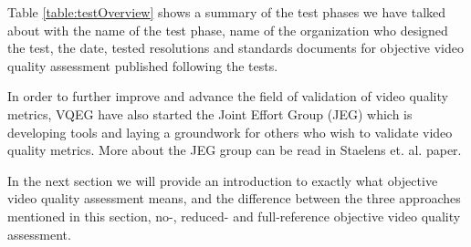 Table \ref{table:testOverview} shows a summary of the test phases we have talked about with the name of the test phase, name of the organization who designed the test, the date, tested resolutions and standards documents for objective video quality assessment published following the tests.

In order to further improve and advance the field of validation of video quality metrics, VQEG have also started the Joint Effort Group (JEG) which is developing tools and laying a groundwork for others who wish to validate video quality metrics. More about the JEG group can be read in Staelens et. al. paper\cite{6065713}.

In the next section we will provide an introduction to exactly what objective video quality assessment means, and the difference between the three approaches mentioned in this section, no-, reduced- and full-reference objective video quality assessment.



